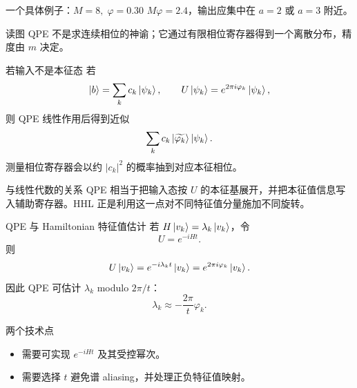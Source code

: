 \documentclass[aspectratio=169,10pt]{ctexbeamer}
\begin{document}
\begin{frame}{一个具体例子：$M=8,\;\varphi=0.30$}
$M\varphi=2.4$，输出应集中在 $a=2$ 或 $a=3$ 附近。
\begin{center}
\end{center}
\begin{warnbox}{读图}
QPE 不是求连续相位的神谕；它通过有限相位寄存器得到一个离散分布，精度由 $m$ 决定。
\end{warnbox}
\end{frame}

\begin{frame}{若输入不是本征态}
若
\[
\ket b=\sum_k c_k\ket{\psi_k},
\qquad U\ket{\psi_k}=e^{2\pi i\varphi_k}\ket{\psi_k},
\]
则 QPE 线性作用后得到近似
\[
\sum_k c_k\ket{\widetilde{\varphi_k}}\ket{\psi_k}.
\]
测量相位寄存器会以约 $|c_k|^2$ 的概率抽到对应本征相位。
\begin{keybox}{与线性代数的关系}
QPE 相当于把输入态按 $U$ 的本征基展开，并把本征值信息写入辅助寄存器。HHL 正是利用这一点对不同特征值分量施加不同旋转。
\end{keybox}
\end{frame}

\begin{frame}{QPE 与 Hamiltonian 特征值估计}
若 $H\ket{v_k}=\lambda_k\ket{v_k}$，令
\[
U=e^{-iHt}.
\]
则
\[
U\ket{v_k}=e^{-i\lambda_k t}\ket{v_k}=e^{2\pi i\varphi_k}\ket{v_k}.
\]
因此 QPE 可估计 $\lambda_k$ modulo $2\pi/t$：
\[
\lambda_k\approx -\frac{2\pi}{t}\varphi_k.
\]
\begin{warnbox}{两个技术点}
\begin{itemize}
\item 需要可实现 $e^{-iHt}$ 及其受控幂次。
\item 需要选择 $t$ 避免谱 aliasing，并处理正负特征值映射。
\end{itemize}
\end{warnbox}
\end{frame}
\end{document}
